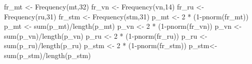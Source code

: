 \documentclass[
]{article}
\newenvironment{Shaded}{\begin{snugshade}}{\end{snugshade}}
\newcommand{\DecValTok}[1]{\textcolor[rgb]{0.00,0.00,0.81}{#1}}
\newcommand{\FunctionTok}[1]{\textcolor[rgb]{0.00,0.00,0.00}{#1}}
\newcommand{\NormalTok}[1]{#1}
\newcommand{\OtherTok}[1]{\textcolor[rgb]{0.56,0.35,0.01}{#1}}
\newcommand{\SpecialCharTok}[1]{\textcolor[rgb]{0.00,0.00,0.00}{#1}}
\begin{document}
\begin{Shaded}
\begin{Highlighting}[]
\NormalTok{fr\_mt }\OtherTok{\textless{}{-}} \FunctionTok{Frequency}\NormalTok{(mt,}\DecValTok{32}\NormalTok{)}
\NormalTok{fr\_vn }\OtherTok{\textless{}{-}} \FunctionTok{Frequency}\NormalTok{(vn,}\DecValTok{14}\NormalTok{)}
\NormalTok{fr\_ru }\OtherTok{\textless{}{-}} \FunctionTok{Frequency}\NormalTok{(ru,}\DecValTok{31}\NormalTok{)}
\NormalTok{fr\_stm }\OtherTok{\textless{}{-}} \FunctionTok{Frequency}\NormalTok{(stm,}\DecValTok{31}\NormalTok{)}
\NormalTok{p\_mt }\OtherTok{\textless{}{-}} \DecValTok{2} \SpecialCharTok{*}\NormalTok{ (}\DecValTok{1}\SpecialCharTok{{-}}\FunctionTok{pnorm}\NormalTok{(fr\_mt))}
\NormalTok{p\_mt }\OtherTok{\textless{}{-}} \FunctionTok{sum}\NormalTok{(p\_mt)}\SpecialCharTok{/}\FunctionTok{length}\NormalTok{(p\_mt)}
\NormalTok{p\_vn }\OtherTok{\textless{}{-}} \DecValTok{2} \SpecialCharTok{*}\NormalTok{ (}\DecValTok{1}\SpecialCharTok{{-}}\FunctionTok{pnorm}\NormalTok{(fr\_vn))}
\NormalTok{p\_vn }\OtherTok{\textless{}{-}} \FunctionTok{sum}\NormalTok{(p\_vn)}\SpecialCharTok{/}\FunctionTok{length}\NormalTok{(p\_vn)}
\NormalTok{p\_ru }\OtherTok{\textless{}{-}} \DecValTok{2} \SpecialCharTok{*}\NormalTok{ (}\DecValTok{1}\SpecialCharTok{{-}}\FunctionTok{pnorm}\NormalTok{(fr\_ru))}
\NormalTok{p\_ru }\OtherTok{\textless{}{-}} \FunctionTok{sum}\NormalTok{(p\_ru)}\SpecialCharTok{/}\FunctionTok{length}\NormalTok{(p\_ru)}
\NormalTok{p\_stm }\OtherTok{\textless{}{-}} \DecValTok{2} \SpecialCharTok{*}\NormalTok{ (}\DecValTok{1}\SpecialCharTok{{-}}\FunctionTok{pnorm}\NormalTok{(fr\_stm))}
\NormalTok{p\_stm}\OtherTok{\textless{}{-}} \FunctionTok{sum}\NormalTok{(p\_stm)}\SpecialCharTok{/}\FunctionTok{length}\NormalTok{(p\_stm)}
\end{Highlighting}
\end{Shaded}
\end{document}
